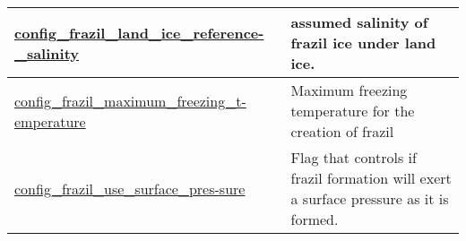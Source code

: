 {\begin{center}
\begin{longtable}{| p{2.0in} || p{4.0in} |}
    \hline
    \hyperref[subsec:nm_sec_config_frazil_land_ice_reference_salinity]{config\_frazil\_land\_ice\_reference-}\hyperref[subsec:nm_sec_config_frazil_land_ice_reference_salinity]{\_salinity}& assumed salinity of frazil ice under land ice. \\
    \hline
    \hyperref[subsec:nm_sec_config_frazil_maximum_freezing_temperature]{config\_frazil\_maximum\_freezing\_t-}\hyperref[subsec:nm_sec_config_frazil_maximum_freezing_temperature]{emperature}& Maximum freezing temperature for the creation of frazil \\
    \hline
    \hyperref[subsec:nm_sec_config_frazil_use_surface_pressure]{config\_frazil\_use\_surface\_pres-}\hyperref[subsec:nm_sec_config_frazil_use_surface_pressure]{sure}& Flag that controls if frazil formation will exert a surface pressure as it is formed. \\
    \hline
\end{longtable}
\end{center}
}
